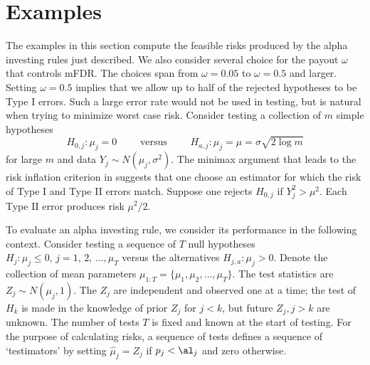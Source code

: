 \documentclass[12pt]{article}
\begin{document}
\section{ Examples }
 
 The examples in this section compute the feasible risks produced by the alpha
 investing rules just described.  We also consider several choice for the payout
 $\omega$ that controls mFDR.  The choices span from $\omega=0.05$ to $\omega =
 0.5$ and larger.  Setting $\omega=0.5$ implies that we allow up to half of the
 rejected hypotheses to be Type I errors.  Such a large error rate would not be
 used in testing, but is natural when trying to minimize worst case risk.
  Consider testing a collection of $m$ simple hypotheses
 \begin{equation}
    H_{0,j}: \mu_j = 0  
    \qquad \mbox{ versus } \qquad 
    H_{a,j}: \mu_j = \mu = \sigma \sqrt{2 \log m}
 \label{eq:simple}
 \end{equation}
 for large $m$ and data $Y_j \sim N(\mu_j, \sigma^2)$.  The minimax argument
 that leads to the risk inflation criterion in \citet{fostergeorge94} suggests
 that one choose an estimator for which the risk of Type I and Type II errors
 match.  Suppose one rejects $H_{0,j}$ if $Y_j^2 > \mu^2$.  Each Type II error
 produces risk $\mu^2/2$.  


 To evaluate an alpha investing rule, we consider its performance in the
 following context.  Consider testing a sequence of $T$ null
 hypotheses $H_j: \mu_j \le 0, \, j=1,\,2,\, \ldots, \mu_T$ versus the alternatives
 $H_{j,a}: \mu_j > 0$.   Denote the collection of mean
 parameters $\mu_{1:T} = \{\mu_1, \mu_2, \ldots, \mu_T\}$.  The test statistics
 are $Z_j \sim N(\mu_j,1)$.  The $Z_j$ are independent and observed one at a
 time; the test of $H_k$ is made in the knowledge of prior $Z_j$ for $j<k$, but
 future $Z_j, j > k$ are unknown.  The number of tests $T$ is fixed and known at
 the start of testing.  For the purpose of calculating risks, a sequence of
 tests defines a sequence of `testimators' by setting $\hat\mu_j = Z_j$ if
 $p_j<\al_j$ and zero otherwise.
 

 
\end{document}
